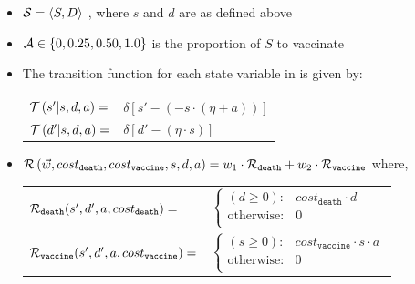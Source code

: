 \begin{itemize}
    \item {\footnotesize $ \mathcal{S} = \left\langle S, D \right\rangle$ }, where $ s $ and $ d $ are as defined above
    \item {\footnotesize $ \mathcal{A} \in \left\lbrace 0, 0.25, 0.50, 1.0 \right\rbrace $} is the proportion of $ S $ to vaccinate
    \item The transition function {\footnotesize \Transition} for each state variable in {\footnotesize \State} is given by:    
    {\footnotesize 
        \abovedisplayskip=5pt
        \belowdisplayskip=0pt
        \renewcommand{\arraystretch}{1.5}
        \begin{tabular}{ll}
            $ \mathcal{T}\left( s' | s, d, a \right) =$ & $ \delta \left[ s' - (- s \cdot (\eta + a)) \right] $ \\
            $ \mathcal{T}\left( d' | s, d, a \right) =$ & $ \delta \left[ d' - (\eta \cdot s) \right] $ \\            
        \end{tabular}
    }%
    \item {\footnotesize $ \mathcal{R}\left(\vec{w}, cost_{\mathtt{death}}, cost_{\mathtt{vaccine}}, s, d, a \right) = w_1 \cdot \mathcal{R}_{\mathtt{death}} + w_2 \cdot \mathcal{R}_{\mathtt{vaccine}}$} where, \\
    {\footnotesize 
        \abovedisplayskip=10pt
        \belowdisplayskip=0pt
        \renewcommand{\arraystretch}{1.5}
        \begin{tabular}{ll}    
            $ \mathcal{R}_{\mathtt{death}}(s', d', a, cost_{\mathtt{death}}) = $ &  
            \qquad $ \begin{cases}
            (d \geq 0) : & cost_{\mathtt{death}} \cdot d \\
            \text{otherwise} : & 0 \\
            \end{cases} $ \\
            $ \mathcal{R}_{\mathtt{vaccine}}(s', d', a, cost_{\mathtt{vaccine}}) = $ &  
            \qquad $ \begin{cases}
            (s \geq 0) : & cost_{\mathtt{vaccine}} \cdot s \cdot a \\
            \text{otherwise} : & 0 \\
            \end{cases} $ \\
        \end{tabular}
    }    
\end{itemize} 


